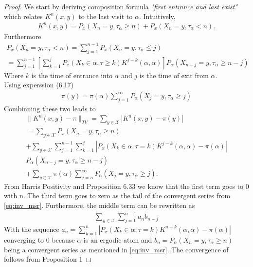\begin{proof}
We start by deriving composition formula \textit{"first entrance and last exist"} which relates $K^n(x,y)$ to the last visit to $\alpha$.
Intuitively, 
\begin{align*}
K^n(x,y) = P_x(X_n = y, \tau_\alpha \geq n) + P_x(X_n = y, \tau_\alpha < n).
\end{align*}
Furthermore
\begin{align*}
    P_x(X_n = y, \tau_\alpha < n) = \sum_{j=1}^{n-1} P_x(X_n = y, \tau_\alpha \leq j) \\
    = \sum_{j=1}^{n-1} \left [\sum_{k=1}^j P_x(X_k \in \alpha, \tau \geq k)K^{j-k}(\alpha, \alpha) \right ]
    P_\alpha(X_{n-j} = y, \tau_\alpha \geq n - j)
\end{align*}
Where $k$ is the time of entrance into $\alpha$ and $j$ is the time of exit from $\alpha$. \\
Using experssion (6.17) 
\begin{align}
    \pi (y) = \pi (\alpha) \sum_{j=1}^{\infty}P_\alpha(X_j = y, \tau_\alpha \geq j) \label{eq:inv_msr}
\end{align}
Combinning these two leads to 
\begin{align*}
    \| K^n(x,y) - \pi \|_{TV} = \sum_{y \in \mathcal{X}}| K^n(x,y) - \pi (y)| \\
    =  \sum_{y \in \mathcal{X}} P_x(X_n = y, \tau_\alpha \geq n) 
\\ + \sum_{y \in \mathcal{X}} \sum_{j=1}^{n-1} \sum_{k=1}^{j} |P_x(X_k \in \alpha, \tau = k) K^{j-k}(\alpha, \alpha) - \pi (\alpha)| 
\\ P_\alpha(X_{n-j} = y, \tau_\alpha \geq n-j) 
\\ + \sum_{y \in \mathcal{X}} \pi (\alpha) \sum_{j=n}^{\infty} P_\alpha(X_j = y, \tau_\alpha \geq j).
\end{align*}
From Harris Positivity and Proposition 6.33 we know that the first term goes to $0$ with n. The third term goes to zero as the tail of the convergent series from \eqref{eq:inv_msr}. Furthermore, the middle term can be rewritten as 
\begin{align}
    \sum_{y \in \mathcal{X}} \sum_{j=1}^{n-1} a_n b_{n-j} \label{eq:conv_prop}
\end{align}
 With the sequence $a_n = \sum_{k=1}^{n} |P_x(X_k \in \alpha, \tau = k) K^{n-k}(\alpha, \alpha) - \pi (\alpha)|$ converging to $0$ because $\alpha$ is an ergodic atom and $b_{n} = P_\alpha(X_{n} = y, \tau_\alpha \geq n)$ being a convergent series as mentioned in \eqref{eq:inv_msr}. The convergence of follows from Proposition 1
\end{proof}